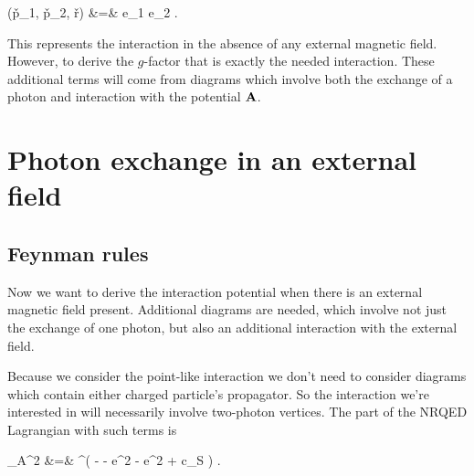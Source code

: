 \small
\beqa
	(\v{p_1}, \v{p_2}, \v{r}) &=& 	
	 e_1 e_2 .
\eeqa
\normalsize

This represents the interaction in the absence of any external magnetic field.  However, to derive the $g$-factor that is exactly the needed interaction.  These additional terms will come from diagrams which involve both the exchange of a photon and interaction with the potential $\mathbf{A}$.

\section{Photon exchange in an external field}

\subsection{Feynman rules}



Now we want to derive the interaction potential when there is an external magnetic field present.  Additional diagrams are needed, which involve not just the exchange of one photon, but also an additional interaction with the external field.

Because we consider the point-like interaction we don't need to consider diagrams which contain either charged particle's propagator.  So the interaction we're interested in will necessarily involve two-photon vertices.  The part of the NRQED Lagrangian with such terms is

\scriptsize
\beqa
	_{A^2} &=& \Psi^\dagger ( -   - e^2  - e^2
		+ c_S  ) \Psi.
\eeqa
\normalsize


